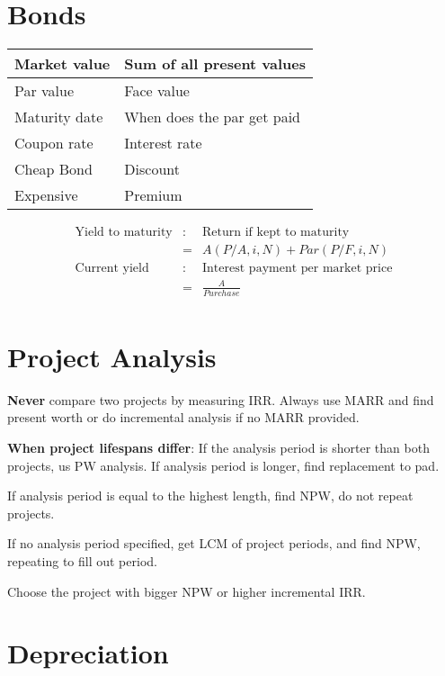 \documentclass[landscape, letterpaper, 10pt]{article}
\begin{document}
\begin{multicols}{3}
    \section*{Bonds}
    \begin{tabular}{|l|l|}
        \hline
        Market value  & Sum of all present values  \\\hline
        Par value     & Face value                 \\\hline
        Maturity date & When does the par get paid \\\hline
        Coupon rate   & Interest rate              \\\hline
        Cheap Bond    & Discount                   \\\hline
        Expensive     & Premium                    \\\hline
    \end{tabular}
    \begin{align*}
        \text{Yield to maturity} & : & \text{Return if kept to maturity}        \\
                                 & = & A(P/A, i, N) + Par(P/F, i, N)            \\
        \text{Current yield}     & : & \text{Interest payment per market price} \\
                                 & = & \frac{A}{Purchase}                       \\
    \end{align*}
    \section*{Project Analysis}
    \textbf{Never} compare two projects by measuring IRR. Always use MARR and find present worth or do incremental analysis if no MARR provided.

    \textbf{When project lifespans differ}: If the analysis period is shorter than both projects, us PW analysis. If analysis period is longer, find replacement to pad.

    If analysis period is equal to the highest length, find NPW, do not repeat projects.

    If no analysis period specified, get LCM of project periods, and find NPW, repeating to fill out period.

    Choose the project with bigger NPW or higher incremental IRR.

    \section*{Depreciation}

\end{multicols}
\end{document}
